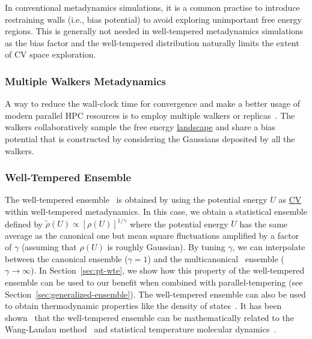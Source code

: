 \documentclass[9pt,review]{livecoms}
\begin{document}
In conventional metadynamics simulations, it is a common practise to introduce restraining walls (i.e., bias potential) to avoid exploring unimportant free energy regions. This is generally not needed in well-tempered metadynamics simulations as the bias factor and the well-tempered distribution naturally limits the extent of CV space exploration.

\subsubsection{Multiple Walkers Metadynamics}
A way to reduce the wall-clock time for convergence and make a better usage of modern parallel HPC resources is to employ multiple walkers or replicas~\cite{Raiteri-JPCB-2006}. The walkers collaboratively sample the free energy \hyperlink{ref:FES} {landscape} and share a bias potential that is constructed by considering the Gaussians deposited by all the walkers.
\subsubsection{Well-Tempered Ensemble}
\label{sec:wtensemble}
The well-tempered ensemble~\cite{Bonomi-PRL-2010} is obtained by using the potential energy $U$ as \hyperlink{ref:CV} {CV} within well-tempered metadynamics. In this case, we obtain a statistical ensemble defined by $\tilde{\rho}(U) \propto [\rho(U)]^{1/\gamma}$ where the potential energy $U$ has the same average as the canonical one but mean square fluctuations amplified by a factor of $\gamma$ (assuming that $\rho(U)$ is roughly Gaussian). By tuning $\gamma$, we can interpolate between the canonical ensemble ($\gamma=1$) and the multicanonical~\cite{Berg1992_Multicanonical} ensemble ($\gamma \to \infty$). In Section~\ref{sec:pt-wte}, we show how this property of the well-tempered ensemble can be used to our benefit when combined with parallel-tempering (see Section~\ref{sec:generalized-ensemble}). The well-tempered ensemble can also be used to obtain thermodynamic properties like the density of states~\cite{Valsson-JCTC-2013}. It has been shown~\cite{Junghans2014wte-wl} that the well-tempered ensemble can be mathematically related to the Wang-Landau method~\cite{wang-landau:prl:2001:wang-landau} and statistical temperature molecular dynamics~\cite{Kim2006_PRL_STMD}.
\end{document}
